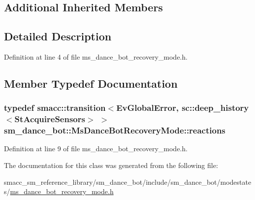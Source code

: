 \subsection*{Additional Inherited Members}


\subsection{Detailed Description}


Definition at line 4 of file ms\+\_\+dance\+\_\+bot\+\_\+recovery\+\_\+mode.\+h.



\subsection{Member Typedef Documentation}
\subsubsection[{\texorpdfstring{reactions}{reactions}}]{\setlength{\rightskip}{0pt plus 5cm}typedef {\bf smacc\+::transition}$<${\bf Ev\+Global\+Error}, sc\+::deep\+\_\+history$<${\bf St\+Acquire\+Sensors}$>$ $>$ {\bf sm\+\_\+dance\+\_\+bot\+::\+Ms\+Dance\+Bot\+Recovery\+Mode\+::reactions}}\hypertarget{classsm__dance__bot_1_1MsDanceBotRecoveryMode_ab51767685284085079620cb13b1e81a1}{}\label{classsm__dance__bot_1_1MsDanceBotRecoveryMode_ab51767685284085079620cb13b1e81a1}


Definition at line 9 of file ms\+\_\+dance\+\_\+bot\+\_\+recovery\+\_\+mode.\+h.



The documentation for this class was generated from the following file\+:\begin{DoxyCompactItemize}
\item 
smacc\+\_\+sm\+\_\+reference\+\_\+library/sm\+\_\+dance\+\_\+bot/include/sm\+\_\+dance\+\_\+bot/modestates/\hyperlink{ms__dance__bot__recovery__mode_8h}{ms\+\_\+dance\+\_\+bot\+\_\+recovery\+\_\+mode.\+h}\end{DoxyCompactItemize}
